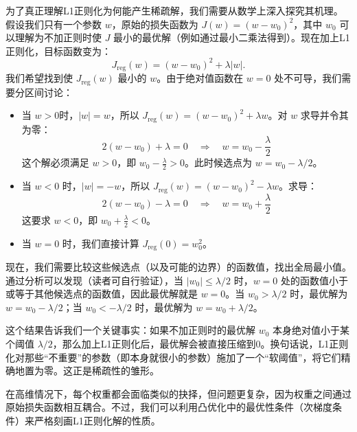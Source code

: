 \documentclass[lang=cn,zihao=-4,a4paper,fontset=windows]{beautybook}
\begin{document}
为了真正理解L1正则化为何能产生稀疏解，我们需要从数学上深入探究其机理。假设我们只有一个参数 \(w\)，原始的损失函数为 \(J(w) = (w - w_0)^2\)，其中 \(w_0\) 可以理解为不加正则时使 \(J\) 最小的最优解（例如通过最小二乘法得到）。现在加上L1正则化，目标函数变为：
\[
J_{\text{reg}}(w) = (w - w_0)^2 + \lambda |w|.
\]
我们希望找到使 \(J_{\text{reg}}(w)\) 最小的 \(w\)。由于绝对值函数在 \(w=0\) 处不可导，我们需要分区间讨论：
\begin{itemize}
\item 当 \(w > 0\)时，\(|w| = w\)，所以 \(J_{\text{reg}}(w) = (w - w_0)^2 + \lambda w\)。对 \(w\) 求导并令其为零：
  \[  2(w - w_0) + \lambda = 0 \quad \Rightarrow \quad w = w_0 - \frac{\lambda}{2}  \]  这个解必须满足 \(w > 0\)，即 \(w_0 - \frac{\lambda}{2} > 0\)。此时候选点为 \(w = w_0 - \lambda/2\)。
\item 当 \(w < 0\) 时，\(|w| = -w\)，所以 \(J_{\text{reg}}(w) = (w - w_0)^2 - \lambda w\)。求导：
  \[  2(w - w_0) - \lambda = 0 \quad \Rightarrow \quad w = w_0 + \frac{\lambda}{2}  \]
  这要求 \(w < 0\)，即 \(w_0 + \frac{\lambda}{2} < 0\)。
\item 当 \(w = 0\) 时，我们直接计算 \(J_{\text{reg}}(0) = w_0^2\)。
\end{itemize}
现在，我们需要比较这些候选点（以及可能的边界）的函数值，找出全局最小值。通过分析可以发现（读者可自行验证），当 \(|w_0| \le \lambda/2\) 时，\(w=0\) 处的函数值小于或等于其他候选点的函数值，因此最优解就是 \(w=0\)。当 \(w_0 > \lambda/2\) 时，最优解为 \(w = w_0 - \lambda/2\)；当 \(w_0 < -\lambda/2\) 时，最优解为 \(w = w_0 + \lambda/2\)。

这个结果告诉我们一个关键事实：如果不加正则时的最优解 \(w_0\) 本身绝对值小于某个阈值 \(\lambda/2\)，那么加上L1正则化后，最优解会被直接压缩到0。换句话说，L1正则化对那些“不重要”的参数（即本身就很小的参数）施加了一个“软阈值”，将它们精确地置为零。这正是稀疏性的雏形。

在高维情况下，每个权重都会面临类似的抉择，但问题更复杂，因为权重之间通过原始损失函数相互耦合。不过，我们可以利用凸优化中的最优性条件（次梯度条件）来严格刻画L1正则化解的性质。
\end{document}
